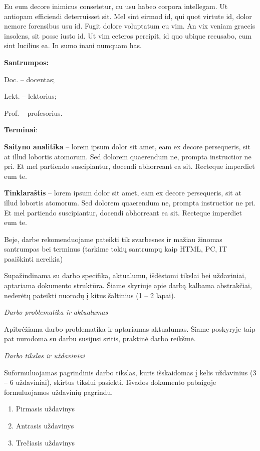 \documentclass{ktuthesis}
\begin{document}
	Eu eum decore inimicus consetetur, cu usu habeo corpora intellegam. Ut antiopam efficiendi deterruisset sit. Mel sint eirmod id, qui quot virtute id, dolor nemore forensibus usu id. Fugit dolore voluptatum cu vim. An vix veniam graecis insolens, sit posse iusto id. Ut vim ceteros percipit, id quo ubique recusabo, eum sint lucilius ea. In sumo inani numquam has.
	\clearpage
	
	\tableofcontents
	\clearpage
	
	\listoftables
	\clearpage
	
	\listoffigures
	\clearpage
	
	
	\textbf{Santrumpos:}
	
	Doc. – docentas;
	
	Lekt. – lektorius;
	
	Prof. – profesorius.
	
	\textbf{Terminai}:
	
	\textbf{Saityno analitika} – lorem ipsum dolor sit amet, eam ex decore persequeris, sit at illud lobortis atomorum. Sed dolorem quaerendum ne, prompta instructior ne pri. Et mel partiendo suscipiantur, docendi abhorreant ea sit. Recteque imperdiet eum te.
	
	\textbf{Tinklaraštis} – lorem ipsum dolor sit amet, eam ex decore persequeris, sit at illud lobortis atomorum. Sed dolorem quaerendum ne, prompta instructior ne pri. Et mel partiendo suscipiantur, docendi abhorreant ea sit. Recteque imperdiet eum te.
	
	Beje, darbe rekomenduojame pateikti tik svarbesnes ir mažiau žinomas santrumpas bei terminus (tarkime tokių santrumpų kaip HTML, PC, IT paaiškinti nereikia)
	\clearpage
	
	
	Supažindinama su darbo specifika, aktualumu, išdėstomi tikslai bei uždaviniai, aptariama dokumento struktūra. Šiame skyriuje apie darbą kalbama abstrakčiai, nederėtų pateikti nuorodų į kitus šaltinius (1 – 2 lapai).
	
	\textit{Darbo problematika ir aktualumas}
	
	Apibrėžiama darbo problematika ir aptariamas aktualumas. Šiame poskyryje taip pat nurodoma su darbu susijusi sritis, praktinė darbo reikšmė.
	
	\textit{Darbo tikslas ir uždaviniai}
	
	Suformuluojamas pagrindinis darbo tikslas, kuris išskaidomas į kelis uždavinius (3 – 6 uždaviniai), skirtus tikslui pasiekti. Išvados dokumento pabaigoje formuluojamos uždavinių pagrindu.
	\begin{enumerate}
		\item Pirmasis uždavinys
		\item Antrasis uždavinys
		\item Trečiasis uždavinys
	\end{enumerate}
	
\end{document}

